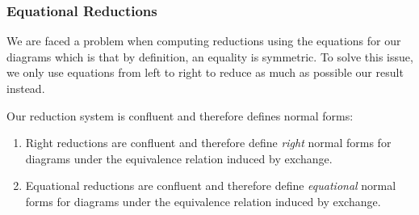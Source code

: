 \subsubsection{Equational Reductions}
We are faced a problem when computing reductions using the equations for our
diagrams which is that by definition, an equality is symmetric.
To solve this issue, we only use equations from left to right to reduce as much
as possible our result instead.
\begin{thm}[Confluence]\label{thm:confluence}
	Our reduction system is confluent and therefore defines normal forms:
	\begin{enumerate}
		\item Right reductions are confluent and therefore define \emph{right} normal forms for
		      diagrams under the equivalence relation induced by exchange.
		\item Equational reductions are confluent and therefore define \emph{equational}
		      normal forms for diagrams under the equivalence relation induced by exchange.
	\end{enumerate}
\end{thm}

